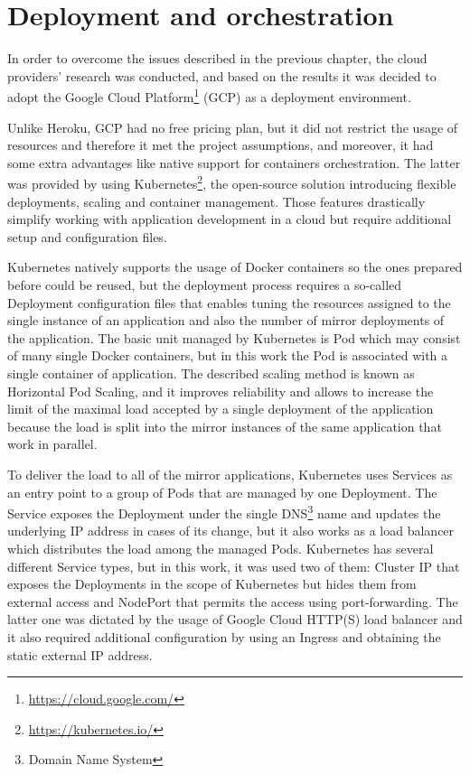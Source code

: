 \section{Deployment and orchestration}\label{sec:deployment-and-orchestration}
In order to overcome the issues described in the previous chapter, the cloud providers' research was conducted, and based on the results it was decided to adopt the Google Cloud Platform\footnote{\url{https://cloud.google.com/}} (GCP) as a deployment environment.

Unlike Heroku, GCP had no free pricing plan, but it did not restrict the usage of resources and therefore it met the project assumptions, and moreover, it had some extra advantages like native support for containers orchestration.
The latter was provided by using Kubernetes\footnote{\url{https://kubernetes.io/}}, the open-source solution introducing flexible deployments, scaling and container management.
Those features drastically simplify working with application development in a cloud but require additional setup and configuration files.

Kubernetes natively supports the usage of Docker containers so the ones prepared before could be reused, but the deployment process requires a so-called Deployment configuration files that enables tuning the resources assigned to the single instance of an application and also the number of mirror deployments of the application.
The basic unit managed by Kubernetes is Pod which may consist of many single Docker containers, but in this work the Pod is associated with a single container of application.
The described scaling method is known as Horizontal Pod Scaling, and it improves reliability and allows to increase the limit of the maximal load accepted by a single deployment of the application because the load is split into the mirror instances of the same application that work in parallel.

To deliver the load to all of the mirror applications, Kubernetes uses Services as an entry point to a group of Pods that are managed by one Deployment.
The Service exposes the Deployment under the single DNS\footnote{Domain Name System} name and updates the underlying IP address in cases of its change, but it also works as a load balancer which distributes the load among the managed Pods.
Kubernetes has several different Service types, but in this work, it was used two of them: Cluster IP that exposes the Deployments in the scope of Kubernetes but hides them from external access and NodePort that permits the access using port-forwarding.
The latter one was dictated by the usage of Google Cloud HTTP(S) load balancer and it also required additional configuration by using an Ingress and obtaining the static external IP address.

